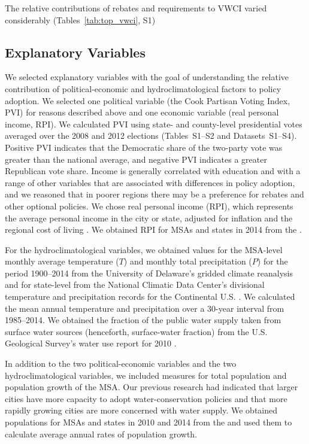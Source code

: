 \documentclass[draft,linenumbers]{agujournal}
\begin{document}
The relative contributions of rebates and requirements to VWCI varied
considerably (Tables~\ref{tab:top_vwci}, S1)

\subsection{Explanatory Variables}
We selected explanatory variables with the goal of understanding the
relative contribution of political-economic and hydroclimatological factors
to policy adoption.
We selected one political variable (the Cook Partisan Voting Index, PVI) for reasons
described above and one economic variable (real personal income, RPI).
We calculated PVI using state- and county-level presidential votes averaged over the
2008 and 2012 elections \citep{cook:pvi:2013,cq:elections:2016}
(Tables~S1--S2 and Datasets~S1--S4).
Positive PVI indicates that the Democratic share of the two-party vote was greater
than the national average, and negative PVI indicates a greater Republican vote share.
Income is generally correlated with education and with a range of other variables that
are associated with differences in policy adoption, and we reasoned that in poorer
regions there may be a preference for rebates and other optional policies.
We chose real personal income (RPI), which represents the average personal income in the city
or state, adjusted for inflation and the regional cost of living
\citep{bea:rpp.methodology:2016}.
We obtained RPI for MSAs and states in 2014 from the
\citet{bea:rpi:2016}.

For the hydroclimatological variables, we
obtained values for the MSA-level monthly average temperature ($T$) and monthly
total precipitation ($P$) for the period 1900--2014 from the University of Delaware's
gridded climate reanalysis
\citep{matsuura:gridded.temp:2015,matsuura:gridded.precip:2015}
and for state-level from the National Climatic Data Center's divisional temperature
and precipitation records for the Continental U.S.
\citep{vose:nclimdiv:2014}.
We calculated the mean annual temperature and precipitation over a
30-year interval from 1985--2014.
We obtained the fraction of the public water supply taken from surface water sources
(henceforth, surface-water fraction) from the U.S. Geological
Survey's water use report for 2010 \citep{maupin:water.use:2014}.

In addition to the two political-economic variables and the two hydroclimatological variables,
we included measures for total population and population growth of the MSA. Our previous research had
indicated that larger cities have more capacity to adopt water-conservation policies and that more
rapidly growing cities are more concerned with water supply. We obtained populations for MSAs and states
in 2010 and 2014 from the \citet{census:population:2015} and used them to calculate average annual rates
of population growth.
\end{document}
